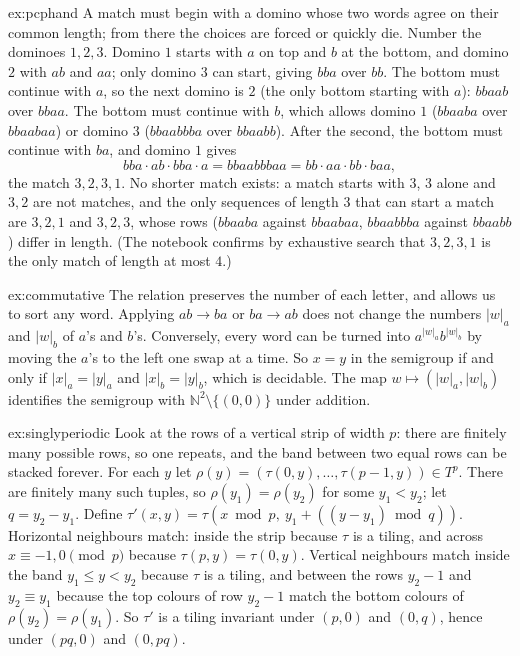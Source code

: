 \begin{solution}{ex:pcphand}
\idea A match must begin with a domino whose two words agree on their common length; from there the choices are forced or quickly die.
\writeup Number the dominoes $1,2,3$. Domino $1$ starts with $a$ on top and $b$ at the bottom, and domino $2$ with $ab$ and $aa$; only domino $3$ can start, giving $bba$ over $bb$. The bottom must continue with $a$, so the next domino is $2$ (the only bottom starting with $a$): $bbaab$ over $bbaa$. The bottom must continue with $b$, which allows domino $1$ ($bbaaba$ over $bbaabaa$) or domino $3$ ($bbaabbba$ over $bbaabb$). After the second, the bottom must continue with $ba$, and domino $1$ gives
\[
bba\cdot ab\cdot bba\cdot a=bbaabbbaa=bb\cdot aa\cdot bb\cdot baa,
\]
the match $3,2,3,1$. No shorter match exists: a match starts with $3$, $3$ alone and $3,2$ are not matches, and the only sequences of length $3$ that can start a match are $3,2,1$ and $3,2,3$, whose rows ($bbaaba$ against $bbaabaa$, $bbaabbba$ against $bbaabb$) differ in length. (The notebook confirms by exhaustive search that $3,2,3,1$ is the only match of length at most $4$.)
\end{solution}

\begin{solution}{ex:commutative}
\idea The relation preserves the number of each letter, and allows us to sort any word.
\writeup Applying $ab\to ba$ or $ba\to ab$ does not change the numbers $|w|_a$ and $|w|_b$ of $a$'s and $b$'s. Conversely, every word can be turned into $a^{|w|_a}b^{|w|_b}$ by moving the $a$'s to the left one swap at a time. So $x=y$ in the semigroup if and only if $|x|_a=|y|_a$ and $|x|_b=|y|_b$, which is decidable. The map $w\mapsto(|w|_a,|w|_b)$ identifies the semigroup with $\mathbb N^2\setminus\{(0,0)\}$ under addition.
\end{solution}

\begin{solution}{ex:singlyperiodic}
\idea Look at the rows of a vertical strip of width $p$: there are finitely many possible rows, so one repeats, and the band between two equal rows can be stacked forever.
\writeup For each $y$ let $\rho(y)=(\tau(0,y),\dots,\tau(p-1,y))\in T^p$. There are finitely many such tuples, so $\rho(y_1)=\rho(y_2)$ for some $y_1<y_2$; let $q=y_2-y_1$. Define $\tau'(x,y)=\tau(x\bmod p,\ y_1+((y-y_1)\bmod q))$. Horizontal neighbours match: inside the strip because $\tau$ is a tiling, and across $x\equiv-1,0\pmod p$ because $\tau(p,y)=\tau(0,y)$. Vertical neighbours match inside the band $y_1\le y<y_2$ because $\tau$ is a tiling, and between the rows $y_2-1$ and $y_2\equiv y_1$ because the top colours of row $y_2-1$ match the bottom colours of $\rho(y_2)=\rho(y_1)$. So $\tau'$ is a tiling invariant under $(p,0)$ and $(0,q)$, hence under $(pq,0)$ and $(0,pq)$.
\end{solution}

